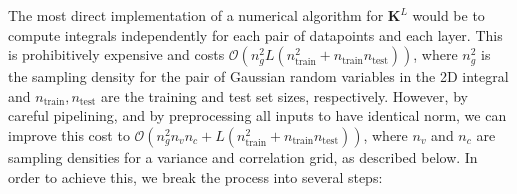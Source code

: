 \documentclass{article} %
\newcommand{\mb}{\mathbf}
\begin{document}
The most direct implementation of a numerical algorithm for $\mb K^L$ would be to compute integrals independently for each pair of datapoints and each layer. This is prohibitively expensive and costs $\mathcal{O}\left(n_g^2 L (n_{\textrm{train}}^2+ n_{\textrm{train}}  n_{\textrm{test}}) \right)$, where $n_g^2$ is the sampling density for the pair of Gaussian random variables in the 2D integral and $n_{\textrm{train}}, n_{\textrm{test}}$ are the training and test set sizes, respectively.
However, by careful pipelining, and by preprocessing all inputs to have identical norm, we can improve this cost to $\mathcal{O}\left(n_g^2 n_v n_c + L (n_{\textrm{train}}^2+ n_{\textrm{train}}  n_{\textrm{test}})  \right)$, where $n_v$ and $n_c$ are sampling densities for a variance and correlation grid, as described below. In order to achieve this, we break the process into several steps:
\end{document}
